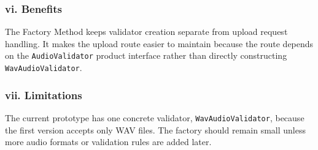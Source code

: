\subsubsection{vi. Benefits}

The Factory Method keeps validator creation separate from upload request handling. It makes the upload route easier to maintain because the route depends on the \texttt{AudioValidator} product interface rather than directly constructing \texttt{WavAudioValidator}.

\subsubsection{vii. Limitations}

The current prototype has one concrete validator, \texttt{WavAudioValidator}, because the first version accepts only WAV files. The factory should remain small unless more audio formats or validation rules are added later.
\fussy

